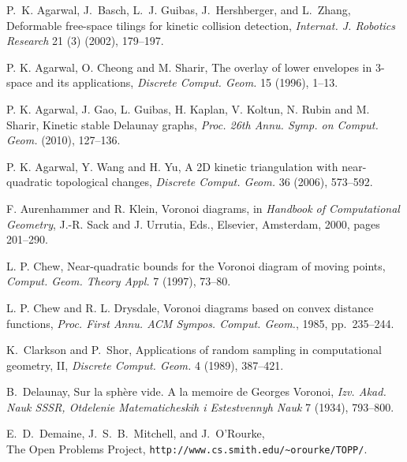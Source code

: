 \documentclass[letter,11pt]{article}
\begin{document}
\begin{thebibliography}{10}










P.~K. Agarwal, J.~Basch, L.~J. Guibas, J.~Hershberger, and L.~Zhang,
Deformable free-space tilings for kinetic collision detection,
{\em Internat. J. Robotics Research} 21 (3) (2002), 179--197.

P. K. Agarwal, O. Cheong and M. Sharir, The overlay of lower
envelopes in 3-space and its applications, {\it Discrete Comput.
Geom.} 15 (1996), 1--13.


P. K. Agarwal, J. Gao, L. Guibas, H. Kaplan, V. Koltun, N. Rubin and M. Sharir,
Kinetic stable Delaunay graphs, \textit{Proc. 26th Annu. Symp. on Comput. Geom.} (2010), 127--136.

P. K. Agarwal, Y. Wang and H. Yu,
A 2D kinetic triangulation with near-quadratic topological changes,
\textit{Discrete Comput. Geom.} 36 (2006), 573--592.







F. Aurenhammer and R. Klein,
Voronoi diagrams,
in {\it Handbook of Computational Geometry},
J.-R. Sack and J. Urrutia, Eds.,
Elsevier, Amsterdam, 2000,
pages 201--290.



L. P. Chew,
Near-quadratic bounds for the  Voronoi diagram of moving points,
{\em Comput. Geom. Theory Appl.}  7 (1997), 73--80.

L. P. Chew and R. L. Drysdale,
Voronoi diagrams based on convex distance functions,
{\em Proc. First Annu. ACM Sympos. Comput. Geom.}, 1985, pp.~235--244.

K.~Clarkson and P.~Shor, Applications of random sampling in
computational geometry, II, \emph{Discrete Comput. Geom.} 4 (1989),
387--421.



B.~Delaunay,
Sur la sph{\`e}re vide. {A} la memoire de {Georges} {Voronoi},
{\em Izv. Akad. Nauk SSSR, Otdelenie Matematicheskih i Estestvennyh
Nauk} 7 (1934), 793--800.

E.~D.~Demaine, J.~S.~B.~Mitchell, and J.~O'Rourke,\\
The Open Problems Project,
\texttt{http://www.cs.smith.edu/\~{ }orourke/TOPP/}.


\end{thebibliography}
\end{document}
